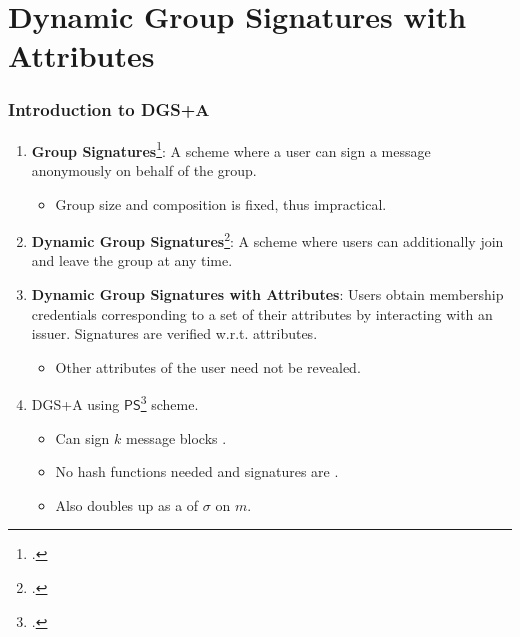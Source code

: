 \documentclass{beamer}
\begin{document}
    \section{Dynamic Group Signatures with Attributes}
    \begin{frame}
        \frametitle{Introduction to DGS+A}
        \begin{enumerate}
            \item<1-> \textbf{Group
            Signatures}\footcite{chaumGroupSignatures1991}: A scheme where a
            user can sign a message anonymously on behalf of the group.
            \begin{itemize}
                \item<2-> Group size and composition is fixed, thus impractical.
            \end{itemize}
            \item<3-> \textbf{Dynamic Group
            Signatures}\footcite{bonehShortGroupSignatures2004}: A scheme where
            users can additionally join and leave the group at any time.
            \item<4-> \textbf{Dynamic Group Signatures with Attributes}: Users
            obtain membership credentials corresponding to a set of their
            attributes by interacting with an issuer. Signatures are verified
            w.r.t. attributes.
            \begin{itemize}
                \item<5-> Other attributes of the user need not be revealed.
            \end{itemize}
            \item<6-> DGS+A using
            \(\mathsf{PS}\)\footcite{pointchevalShortRandomizableSignatures2015}
            scheme.
            \begin{itemize}
                \item Can sign \(k\) message blocks .
                \item No hash functions needed and signatures are
                .
                \item Also doubles up as a  of \(\sigma\) on \(m\).
            \end{itemize}
        \end{enumerate}
    \end{frame}
\end{document}

